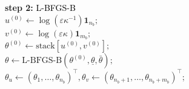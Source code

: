 \begin{algorithm}[htbp]
\noindent \textbf{step 2:} \textcolor{black}{L-BFGS-B}\\

\nl  $u^{(0)} \gets \log(\varepsilon\kappa^{-1}) \mathbf 1_{n_b} ;$\\
\nl  $v^{(0)} \gets \log(\varepsilon\kappa) \mathbf 1_{m_b} ;$\\
\nl  $\theta^{(0)} \gets \text{stack}[u^{(0)}, v^{(0)}];$\\
\nl   $\theta \gets \text{L-BFGS-B}(\theta^{(0)}, \underline{\theta}, \bar{\theta});$\\
\nl   $\theta_u \gets (\theta_1, \ldots, \theta_{n_b})^\top, \theta_v \gets(\theta_{n_b+1}, \ldots, \theta_{n_b+m_b})^\top;$\\


\\
\\
\nl   {}
\end{algorithm}

